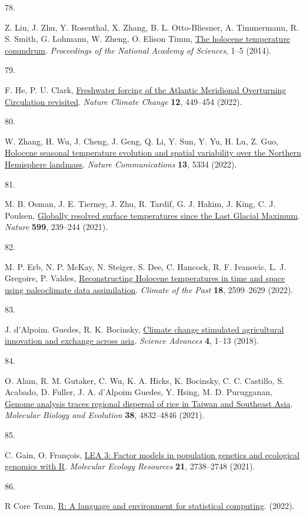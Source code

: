 \documentclass[
  letterpaper,
  DIV=11,
  numbers=noendperiod]{scrartcl}
\newlength{\cslhangindent}
\newlength{\csllabelwidth}
\newenvironment{CSLReferences}[2] %
 {\begin{list}{}{%
  \setlength{\itemindent}{0pt}
  \setlength{\leftmargin}{0pt}
  \setlength{\parsep}{0pt}
  \ifodd #1
   \setlength{\leftmargin}{\cslhangindent}
   \setlength{\itemindent}{-1\cslhangindent}
  \fi
  \setlength{\itemsep}{#2\baselineskip}}}
 {\end{list}}
\newcommand{\CSLLeftMargin}[1]{\parbox[t]{\csllabelwidth}{\strut#1\strut}}
\newcommand{\CSLRightInline}[1]{\parbox[t]{\linewidth - \csllabelwidth}{\strut#1\strut}}
\begin{document}
\begin{CSLReferences}{0}{1}
\CSLLeftMargin{78. }%
\CSLRightInline{Z. Liu, J. Zhu, Y. Rosenthal, X. Zhang, B. L.
Otto-Bliesner, A. Timmermann, R. S. Smith, G. Lohmann, W. Zheng, O.
Elison Timm, \href{https://doi.org/10.1073/pnas.1407229111}{The holocene
temperature conundrum}. \emph{Proceedings of the National Academy of
Sciences}, 1--5 (2014).}

\CSLLeftMargin{79. }%
\CSLRightInline{F. He, P. U. Clark,
\href{https://doi.org/10.1038/s41558-022-01328-2}{Freshwater forcing of
the Atlantic Meridional Overturning Circulation revisited}. \emph{Nature
Climate Change} \textbf{12}, 449--454 (2022).}

\CSLLeftMargin{80. }%
\CSLRightInline{W. Zhang, H. Wu, J. Cheng, J. Geng, Q. Li, Y. Sun, Y.
Yu, H. Lu, Z. Guo,
\href{https://doi.org/10.1038/s41467-022-33107-0}{Holocene seasonal
temperature evolution and spatial variability over the Northern
Hemisphere landmass}. \emph{Nature Communications} \textbf{13}, 5334
(2022).}

\CSLLeftMargin{81. }%
\CSLRightInline{M. B. Osman, J. E. Tierney, J. Zhu, R. Tardif, G. J.
Hakim, J. King, C. J. Poulsen, \href{https://doi.org/10/gndxqj}{Globally
resolved surface temperatures since the Last Glacial Maximum}.
\emph{Nature} \textbf{599}, 239--244 (2021).}

\CSLLeftMargin{82. }%
\CSLRightInline{M. P. Erb, N. P. McKay, N. Steiger, S. Dee, C. Hancock,
R. F. Ivanovic, L. J. Gregoire, P. Valdes,
\href{https://doi.org/10.5194/cp-18-2599-2022}{Reconstructing Holocene
temperatures in time and space using paleoclimate data assimilation}.
\emph{Climate of the Past} \textbf{18}, 2599--2629 (2022).}

\CSLLeftMargin{83. }%
\CSLRightInline{J. d'Alpoim. Guedes, R. K. Bocinsky,
\href{https://doi.org/10.1126/sciadv.aar4491}{Climate change stimulated
agricultural innovation and exchange across asia}. \emph{Science
Advances} \textbf{4}, 1--13 (2018).}

\CSLLeftMargin{84. }%
\CSLRightInline{O. Alam, R. M. Gutaker, C. Wu, K. A. Hicks, K. Bocinsky,
C. C. Castillo, S. Acabado, D. Fuller, J. A. d'Alpoim Guedes, Y. Hsing,
M. D. Purugganan, \href{https://doi.org/10.1093/molbev/msab209}{Genome
analysis traces regional dispersal of rice in {Taiwan} and {Southeast}
{Asia}}. \emph{Molecular Biology and Evolution} \textbf{38}, 4832--4846
(2021).}

\CSLLeftMargin{85. }%
\CSLRightInline{C. Gain, O. François,
\href{https://doi.org/10.1111/1755-0998.13366}{LEA 3: Factor models in
population genetics and ecological genomics with R}. \emph{Molecular
Ecology Resources} \textbf{21}, 2738--2748 (2021).}

\CSLLeftMargin{86. }%
\CSLRightInline{R Core Team, \href{https://www.R-project.org/}{R: A
language and environment for statistical computing}. (2022).}

\end{CSLReferences}
\end{document}
